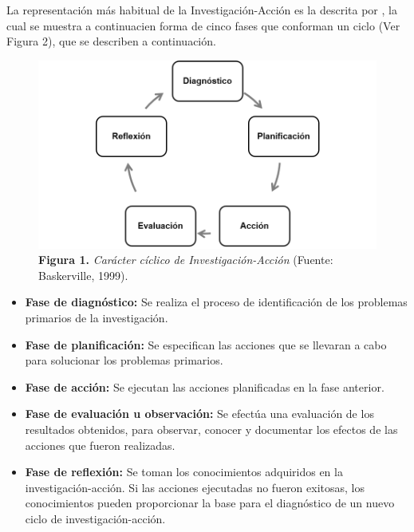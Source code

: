 	La representaci\'{o}n m\'{a}s habitual de la Investigaci\'{o}n-Acci\'{o}n es la descrita por \cite{Baskerville}, la cual se muestra a continuacien forma de cinco fases que conforman un ciclo (Ver Figura 2), que se describen a continuaci\'{o}n.
	\FloatBarrier %
	\begin{figure}
		\centering
		\includegraphics[scale=0.77]{img/investigacion-accion.png}
			\caption{\textbf{Figura 1.} \textit{Car\'{a}cter c\'{i}clico de Investigaci\'{o}n-Acci\'{o}n} (Fuente: Baskerville, 1999).}
	\end{figure}
	\FloatBarrier %
	\begin{itemize}
		\item \textbf{Fase de diagn\'{o}stico:} Se realiza el proceso de identificaci\'{o}n de los problemas primarios de la investigaci\'{o}n.
		\item \textbf{Fase de planificaci\'{o}n:} Se especifican las acciones que se llevaran a cabo para solucionar los problemas primarios.
		\item \textbf{Fase de acci\'{o}n:} Se ejecutan las acciones planificadas en la fase anterior.
		\item \textbf{Fase de evaluaci\'{o}n u observaci\'{o}n:} Se efect\'{u}a una evaluaci\'{o}n de los resultados obtenidos, para observar, conocer y documentar los efectos de las acciones que fueron realizadas.
		\item \textbf{Fase de reflexi\'{o}n:} Se toman los conocimientos adquiridos en la investigaci\'{o}n-acci\'{o}n. Si las acciones ejecutadas no fueron exitosas, los conocimientos pueden proporcionar la base para el diagn\'{o}stico de un nuevo ciclo de investigaci\'{o}n-acci\'{o}n.
	\end{itemize}

